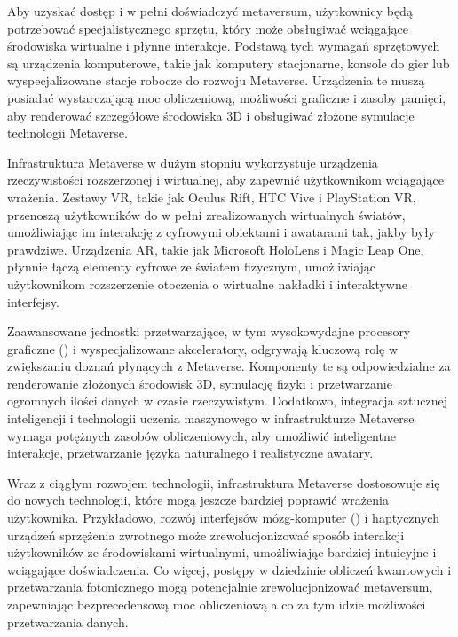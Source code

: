 Aby uzyskać dostęp i w pełni doświadczyć metaversum, użytkownicy będą potrzebować specjalistycznego sprzętu, który może obsługiwać wciągające środowiska wirtualne i płynne interakcje. Podstawą tych wymagań sprzętowych są urządzenia komputerowe, takie jak komputery stacjonarne, konsole do gier lub wyspecjalizowane stacje robocze do rozwoju Metaverse. Urządzenia te muszą posiadać wystarczającą moc obliczeniową, możliwości graficzne i zasoby pamięci, aby renderować szczegółowe środowiska 3D i obsługiwać złożone symulacje technologii Metaverse\cite{metaverseInfrastructureIEEE}.

Infrastruktura Metaverse w dużym stopniu wykorzystuje urządzenia rzeczywistości rozszerzonej i wirtualnej, aby zapewnić użytkownikom wciągające wrażenia. Zestawy VR, takie jak Oculus Rift, HTC Vive i PlayStation VR, przenoszą użytkowników do w pełni zrealizowanych wirtualnych światów, umożliwiając im interakcję z cyfrowymi obiektami i awatarami tak, jakby były prawdziwe. Urządzenia AR, takie jak Microsoft HoloLens i Magic Leap One, płynnie łączą elementy cyfrowe ze światem fizycznym, umożliwiając użytkownikom rozszerzenie otoczenia o wirtualne nakładki i interaktywne interfejsy\cite{metaverseInfrastructureIEEE}.

Zaawansowane jednostki przetwarzające, w tym wysokowydajne procesory graficzne  () i wyspecjalizowane akceleratory, odgrywają kluczową rolę w zwiększaniu doznań płynących z Metaverse. Komponenty te są odpowiedzialne za renderowanie złożonych środowisk 3D, symulację fizyki i przetwarzanie ogromnych ilości danych w czasie rzeczywistym. Dodatkowo, integracja sztucznej inteligencji i technologii uczenia maszynowego w infrastrukturze Metaverse wymaga potężnych zasobów obliczeniowych, aby umożliwić inteligentne interakcje, przetwarzanie języka naturalnego i realistyczne awatary\cite{metaverseInfrastructureIEEE}.

Wraz z ciągłym rozwojem technologii, infrastruktura Metaverse dostosowuje się do nowych technologii, które mogą jeszcze bardziej poprawić wrażenia użytkownika. Przykładowo, rozwój interfejsów mózg-komputer  () i haptycznych urządzeń sprzężenia zwrotnego może zrewolucjonizować sposób interakcji użytkowników ze środowiskami wirtualnymi, umożliwiając bardziej intuicyjne i wciągające doświadczenia. Co więcej, postępy w dziedzinie obliczeń kwantowych i przetwarzania fotonicznego mogą potencjalnie zrewolucjonizować metaversum, zapewniając bezprecedensową moc obliczeniową a co za tym idzie możliwości przetwarzania danych\cite{metaverseInfrastructureIEEE}.

